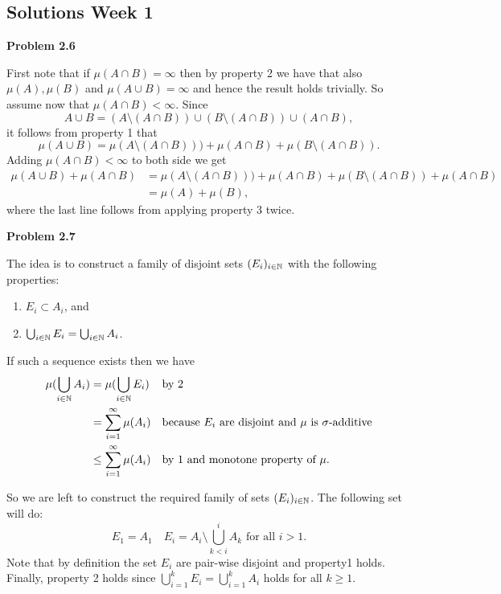 \documentclass[a4paper,10pt]{article}
\begin{document}
\subsection*{Solutions Week 1}

\textbf{Problem 2.6}

First note that if $\mu(A \cap B) = \infty$ then by property 2 we have that also $\mu(A), \mu(B)$ and $\mu(A \cup B) = \infty$ and hence the result holds trivially. So assume now that $\mu(A \cap B) < \infty$. Since 
\[
	A \cup B = (A \setminus (A\cap B)) \cup (B \setminus (A \cap B)) \cup (A \cap B),
\] 
it follows from property 1 that
\[
	\mu(A \cup B) = \mu(A \setminus (A \cap B))) + \mu(A \cap B) + \mu(B \setminus (A \cap B)).
\] 
Adding $\mu(A \cap B) < \infty$ to both side we get
\begin{align*}
	\mu(A \cup B) + \mu(A \cap B) 
	&= \mu(A \setminus (A \cap B))) + \mu(A \cap B) + \mu(B \setminus (A \cap B)) + \mu(A \cap B)\\
	&= \mu(A) + \mu(B), 
\end{align*}
where the last line follows from applying property 3 twice.  
 
\bigskip 

\textbf{Problem 2.7}

The idea is to construct a family of disjoint sets $(E_i)_{i \in \mathbb N}$ with the following properties:
\begin{enumerate}
\item $E_i \subset A_i$, and
\item $\bigcup_{i \in \mathbb N} E_i = \bigcup_{i \in \mathbb N} A_i$.
\end{enumerate}

If such a sequence exists then we have
\begin{align*}
	\mu(\bigcup_{i \in \mathbb N} A_i) &= \mu(\bigcup_{i \in \mathbb N} E_i) &&\text{by 2}\\
	&= \sum_{i = 1}^\infty \mu(A_i) &&\text{because $E_i$ are disjoint and $\mu$ is $\sigma$-additive}\\
	&\le \sum_{i = 1}^\infty \mu(A_i) &&\text{by 1 and monotone property of $\mu$}.
\end{align*}

So we are left to construct the required family of sets $(E_i)_{i \in \mathbb N}$. The following set will do:
\[
	E_1 = A_1 \quad E_i = A_i \setminus \bigcup_{k < i}^i A_k \text{ for all } i > 1.
\]
Note that by definition the set $E_i$ are pair-wise disjoint and property1 holds. Finally, property 2 holds since $\bigcup_{i = 1}^k E_i = \bigcup_{i = 1}^k A_i$ holds for all $k \ge 1$.
\end{document}
